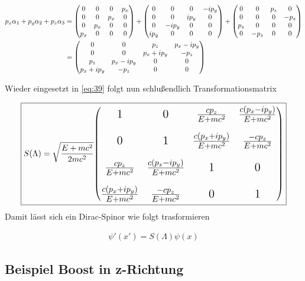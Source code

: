 \begin{align}
  \label{eq:41}
  p_x\alpha_1+p_y\alpha_2+p_z\alpha_3 &=
  \begin{pmatrix}
     0&0&0&p_x\\
   0&0&p_x&0\\
 0&p_x&0&0\\
 p_x&0&0&0
  \end{pmatrix}+ \begin{pmatrix}
   0&0&0&-ip_y\\
   0&0&ip_y&0\\
 0&-ip_y&0&0\\
 ip_y&0&0&0
  \end{pmatrix}+
 \begin{pmatrix}
   0&0&p_z&0\\
   0&0&0&-p_z\\
 p_z&0&0&0\\
 0&-p_z&0&0
  \end{pmatrix}\notag\\
&=  \begin{pmatrix}
     0&0&p_z&p_x-ip_y\\
   0&0&p_x+ip_y&-p_z\\
 p_z&p_x-ip_y&0&0\\
 p_x+ip_y&-p_z&0&0
  \end{pmatrix}
\end{align}

Wieder eingesetzt in \eqref{eq:39} folgt nun schlußendlich Transformationsmatrix

\begin{align}
  \label{eq:42}
\boxed{
  S(\Lambda)=\sqrt{\frac{E + mc^2}{2mc^2}}
  {
    \Large
  \begin{pmatrix}
    1&0&\frac{cp_z}{E+mc^2}&\frac{c(p_x-ip_y)}{E+mc^2}\\[2ex]
    0&1&\frac{c(p_x+ip_y)}{E+mc^2}&\frac{-cp_z}{E+mc^2}\\[2ex]
    \frac{cp_z}{E+mc^2}&\frac{c(p_x-ip_y)}{E+mc^2}&1&0\\[2ex]
    \frac{c(p_x+ip_y)}{E+mc^2}&\frac{-cp_z}{E+mc^2}&0&1
  \end{pmatrix}
  }
}
\end{align}
Damit lässt sich ein Dirac-Spinor wie folgt trasformieren

\begin{align}
  \label{eq:43}
  \psi'(x') = S(\Lambda)\psi(x)
\end{align}


\subsection*{Beispiel Boost in z-Richtung}

